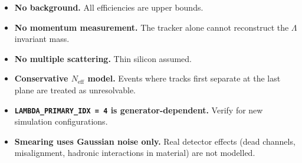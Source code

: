 \documentclass[11pt]{article}
\begin{document}
\begin{itemize}
  \item \textbf{No background.} All efficiencies are upper bounds.
  \item \textbf{No momentum measurement.} The tracker alone cannot
        reconstruct the $\Lambda$ invariant mass.
  \item \textbf{No multiple scattering.} Thin silicon assumed.
  \item \textbf{Conservative $N_\text{eff}$ model.} Events where tracks
        first separate at the last plane are treated as unresolvable.
  \item \textbf{\texttt{LAMBDA\_PRIMARY\_IDX = 4} is generator-dependent.}
        Verify for new simulation configurations.
  \item \textbf{Smearing uses Gaussian noise only.} Real detector effects
        (dead channels, misalignment, hadronic interactions in material)
        are not modelled.
\end{itemize}
\end{document}
